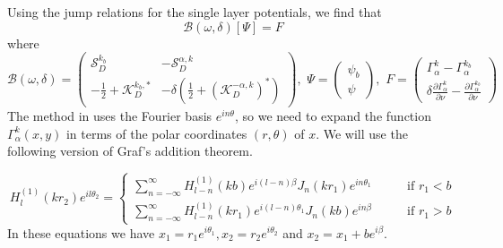 \documentclass[a4paper]{article}
\theoremstyle{definition}
\newcommand{\B}{\mathcal{B}}
\renewcommand{\S}{\mathcal{S}}
\newcommand{\K}{\mathcal{K}}
\begin{document}
Using the jump relations for the single layer potentials, we find that
\begin{equation*}
\B(\omega,\delta)[\Psi] = F
\end{equation*}
where 
\begin{equation*}
\B(\omega, \delta) = 
\begin{pmatrix}
\S_D^{k_b} &  -\S_D^{\alpha,k}  \\
-\frac{1}{2}+ \K_D^{k_b, *}& -\delta( \frac{1}{2}+ (\K_D^{ -\alpha,k})^*)
\end{pmatrix}, 
\,\, \Psi= 
\begin{pmatrix}
\psi_b\\
\psi
\end{pmatrix},
\,\, F=
\begin{pmatrix}
\Gamma_\alpha^{k} - \Gamma_\alpha^{k_b} \\
\delta\frac{\partial \Gamma_\alpha^{k}}{\partial \nu} -
\frac{\partial \Gamma_\alpha^{k_b}}{\partial \nu} 
\end{pmatrix}
\end{equation*}
The method in \cite{bandgap} uses the Fourier basis $e^{in\theta}$, so  we need to expand the function $\Gamma_\alpha^k(x,y)$ in terms of the polar coordinates $(r,\theta)$ of $x$. We will use the following version of Graf's addition theorem.

\begin{equation*}
H_l^{(1)}(kr_2)e^{il\theta_2} =
\begin{cases}
\sum_{n=-\infty}^\infty H_{l-n}^{(1)}(kb)e^{i(l-n)\beta}J_n(kr_1)e^{in\theta_1} \qquad &\text{if } r_1<b \\
\sum_{n=-\infty}^\infty H_{l-n}^{(1)}(kr_1)e^{i(l-n)\theta_1}J_n(kb)e^{in\beta} \qquad &\text{if } r_1>b
\end{cases}
\end{equation*}
In these equations we have $x_1 = r_1e^{i\theta_1}, x_2 = r_2e^{i\theta_2}$ and $x_2 = x_1 + be^{i\beta}$. 
\end{document}
